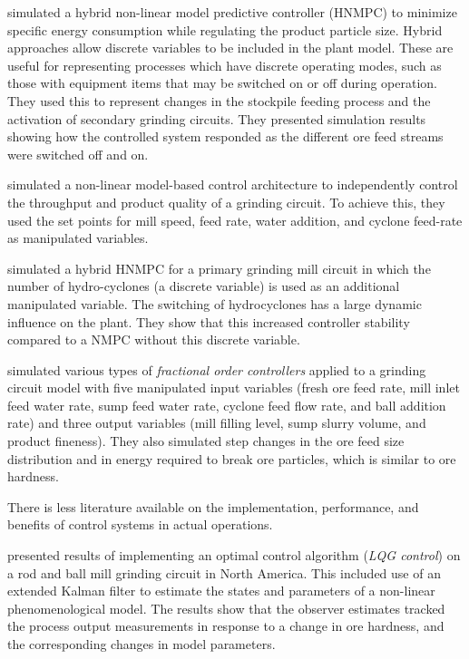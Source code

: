 \cite{estrada_hybrid_2014} simulated a hybrid non-linear model predictive controller (HNMPC) to minimize specific energy consumption while regulating the product particle size. Hybrid approaches allow discrete variables to be included in the plant model. These are useful for representing processes which have discrete operating modes, such as those with equipment items that may be switched on or off during operation. They used this to represent changes in the stockpile feeding process and the activation of secondary grinding circuits. They presented simulation results showing how the controlled system responded as the different ore feed streams were switched off and on.

\cite{le_roux_throughput_2016} simulated a non-linear model-based control architecture to independently control the throughput and product quality of a grinding circuit. To achieve this, they used the set points for mill speed, feed rate, water addition, and cyclone feed-rate as manipulated variables.

\cite{botha_hybrid_2018} simulated a hybrid HNMPC for a primary grinding mill circuit in which the number of hydro-cyclones (a discrete variable) is used as an additional manipulated variable. The switching of hydrocyclones has a large dynamic influence on the plant. They show that this increased controller stability compared to a NMPC without this discrete variable.

\cite{aguila-camacho_control_2017} simulated various types of \textit{fractional order controllers} applied to a grinding circuit model with five manipulated input variables (fresh ore feed rate, mill inlet feed water rate, sump feed water rate, cyclone feed flow rate, and ball addition rate) and three output variables (mill filling level, sump slurry volume, and product fineness). They also simulated step changes in the ore feed size distribution and in energy required to break ore particles, which is similar to ore hardness.

There is less literature available on the implementation, performance, and benefits of control systems in actual operations.

\cite{herbst_optimal_1988} presented results of implementing an optimal control algorithm (\textit{LQG control}) on a rod and ball mill grinding circuit in North America. This included use of an extended Kalman filter to estimate the states and parameters of a non-linear phenomenological model. The results show that the observer estimates tracked the process output measurements in response to a change in ore hardness, and the corresponding changes in model parameters.

